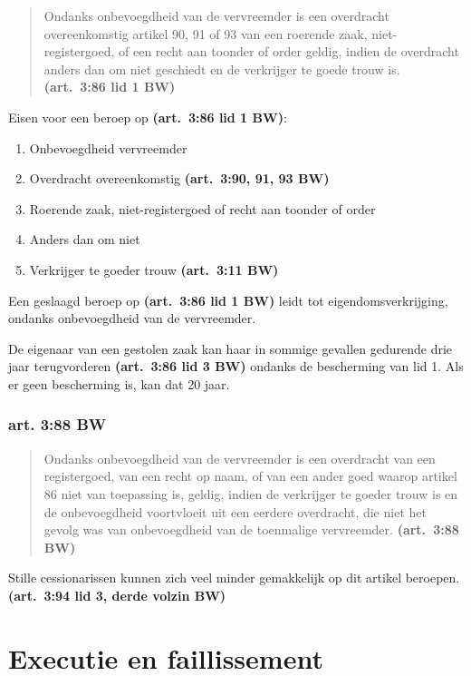 \documentclass[a4paper]{article}
\newcommand{\art}[1]{\textbf{(art.~#1 BW)}\xspace}
\begin{document}
\begin{quote}

  Ondanks onbevoegdheid van de vervreemder is een overdracht overeenkomstig
  artikel 90, 91 of 93 van een roerende zaak, niet-registergoed, of een recht
  aan toonder of order geldig, indien de overdracht anders dan om niet
  geschiedt en de verkrijger te goede trouw is. \art{3:86 lid 1}

\end{quote}

Eisen voor een beroep op \art{3:86 lid 1}:
\begin{enumerate}
  \item Onbevoegdheid vervreemder
  \item Overdracht overeenkomstig \art{3:90, 91, 93}
  \item Roerende zaak, niet-registergoed of recht aan toonder of order
  \item Anders dan om niet
  \item Verkrijger te goeder trouw \art{3:11}
\end{enumerate}

Een geslaagd beroep op \art{3:86 lid 1} leidt tot eigendomsverkrijging,
ondanks onbevoegdheid van de vervreemder.

De eigenaar van een gestolen zaak kan haar in sommige gevallen gedurende drie
jaar terugvorderen \art{3:86 lid 3} ondanks de bescherming van lid 1. Als er
geen bescherming is, kan dat 20 jaar.

\subsubsection{art. 3:88 BW}

\begin{quote}

  Ondanks onbevoegdheid van de vervreemder is een overdracht van een
  registergoed, van een recht op naam, of van een ander goed waarop artikel 86
  niet van toepassing is, geldig, indien de verkrijger te goeder trouw is en
  de onbevoegdheid voortvloeit uit een eerdere overdracht, die niet het gevolg
  was van onbevoegdheid van de toenmalige vervreemder. \art{3:88}

\end{quote}

Stille cessionarissen kunnen zich veel minder gemakkelijk op dit artikel
beroepen. \art{3:94 lid 3, derde volzin}

\section{Executie en faillissement}
\end{document}
